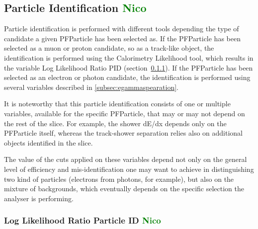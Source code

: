\documentclass[a4paper]{article}
\begin{document}
\subsection{Particle Identification \textcolor{green}{Nico}}
Particle identification is performed with different tools depending the type of candidate a given PFParticle has been selected as.
If the PFParticle has been selected as a muon or proton candidate, so as a track-like object, the identification is performed using the Calorimetry Likelihood tool, which results in the variable Log Likelihood Ratio PID  (section~\ref{subsec:loglikelihoodpid}).
If the PFParticle has been selected as an electron or photon candidate, the identification is performed using several variables described in \ref{subsec:egammaspearation}.

It is noteworthy that this particle identification consists of one or multiple variables, available for the specific PFParticle, that may or may not depend on the rest of the slice. 
For example, the shower dE/dx depends only on the PFParticle itself, whereas the track-shower separation relies also on additional objects identified in the slice.

The value of the cuts applied on these variables depend not only on the general level of efficiency and mis-identification one may want to achieve in distinguishing two kind of particles (electrons from photons, for example), but also on the mixture of backgrounds, which eventually depends on the specific selection the analyser is performing.

\subsubsection{Log Likelihood Ratio Particle ID \textcolor{green}{Nico}}
\label{subsec:loglikelihoodpid}
\end{document}
